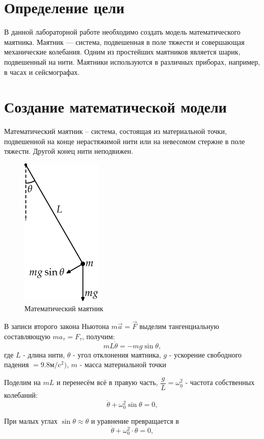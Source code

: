 \documentclass[a4paper, 14pt]{extarticle}
\begin{document}
	\pagebreak	

	\section{Определение цели}
		В данной лабораторной работе необходимо создать модель математического маятника. Маятник — система, подвешенная в поле тяжести и совершающая механические колебания. Одним из простейших маятников является шарик, подвешенный на нити. Маятники используются в различных приборах, например, в часах и сейсмографах.
		
	\section{Создание математической модели}
		Математический маятник -- система, состоящая из материальной точки, подвешенной на конце нерастяжимой
		нити или на невесомом стержне в поле тяжести. Другой конец нити неподвижен.
		\begin{figure}[H]
			\centering
			\includegraphics[]{fig1.png}
			\caption[.] {Математический маятник}
		\end{figure}
	
		В записи второго закона Ньютона \(m\vec{a} = \vec{F}\) выделим тангенциальную составляющую
		\(ma_\tau = F_\tau\), получим:
			\[ mL\ddot{\theta} = -mg\sin{\theta}, \]
		где $L$ - длина нити, $\theta$ - угол отклонения маятника, $g$ - ускорение свободного падения 
		$ = 9.8 \text{м/}\text{c}^2)$, $m$ - масса материальной точки
		
		Поделим на $mL$ и перенесём всё в правую часть, \(\dfrac{g}{L} = \omega_0^2 \) - частота собственных
		колебаний:
		\[ \ddot{\theta} + \omega_0^2\sin{\theta} = 0, \]
		
		При малых углах \( \sin{\theta} \approx \theta \) и уравнение превращается в
		\[ \ddot{\theta} + \omega_0^2 \cdot \theta = 0, \]
		
\end{document}
